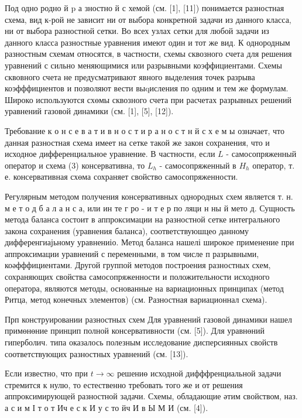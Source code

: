 \documentclass[10pt]{article}
\begin{document}
Под одно родно й $\mathrm{p}$ а зностно й с хемой (см. [1], [11]) понимается разностная схема, вид к-рой не зависит ни от выбора конкретной задачи из данного класса, ни от выбора разностной сетки. Во всех узлах сетки для любой задачи из данного класса разностные уравнения имеют один и тот же вид. К однородным разностным схемам относятся, в частности, схемы сквозного счета для решения уравнений с сильно меняющимися или разрывными коэффициентами. Схемы сквовного счета не предусматривают явного выделения точек разрыва коэфффициентов и позволяют вести выqисления по одним и тем же формулам. Широко используются схөмы сквозного счета при расчетах разрывных решений уравнений газовой динамики (см. [1], [5], [12]).



Требование к о н с е в а т и в н о с т и р а н о с т н й с х е м ы означает, что данная разностная схема имеет на сетке такой же закон сохранения, что и исходное дифференциальное уравнение. В частности, если $L$ - самосопряженный оператор и схема (3) консервативна, то $L_{h}$ - самосопряженный в $H_{h}$ оператор, т. е. консервативная схөма сохраняет свойство самосопряженности.



Регулярным методом получения консервативных однородных схем является т. н. м е т о д б а л а н с а, или ин те г ро - и т е р по ляци н ны й мето д. Сущность метода баланса состоит в аппроксимации на разностной сетке интегрального закона сохранения (уравнения баланса), соответствуюшцео данному дифференгиајьному уравнениіо. Метод б́аланса нашелі широкое применение при аппроксимации уравнений с переменными, в том числе п разрывными, коәфффициентами. Другой группой методов построения разностных схем, сохраняющих свойства самосопряженности и положительности исходного оператора, являются методы, основанные на вариационных принципах (метод Ритца, метод конечных элементов) (см. Разностная вариационнал схема).



Прп конструировании разностных схем Для уравнений газовой динамики нашел примөнөние принцип полной консервативности (см. [5]). Для уравнөний гиперболич. типа оказалось полезным исследование дисперсиянных свойств соответствующих разностных уравнений (см. [13]).



Если известно, что при $t \rightarrow \infty$ решениө исходной дифффренциальной задачи стремится к нулю, то естественно требовать того же и от решения аппроксимирующей разностной задачи. Схемы, обладающие әтим свойством, наз. а с и м І т о т Ич е с к И у с то йч И в Ы М И (см. [4]).
\end{document}
